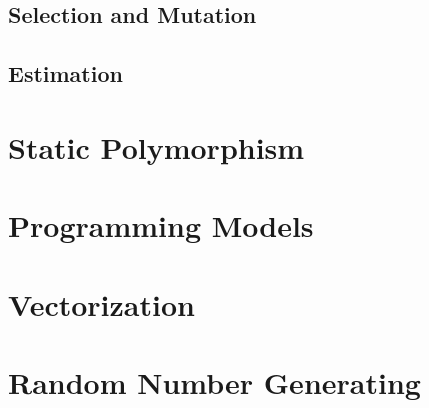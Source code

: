 \subsection{Selection and Mutation}
\label{sub:Selection and Mutation}

\subsection{Estimation}
\label{sub:Estimation}

\section{Static Polymorphism}
\label{sec:Static Polymorphism}

\section{Programming Models}
\label{sec:Programming Models}

\section{Vectorization}
\label{sec:Vectorization}

\section{Random Number Generating}
\label{sec:Random Number Generating}
